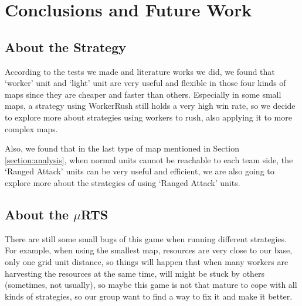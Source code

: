 \section{Conclusions and Future Work}

\subsection*{About the Strategy}

According to the tests we made and literature works we did, we found that ‘worker’ unit
and ‘light’ unit are very useful and flexible in those four kinds of maps since they are
cheaper and faster than others. Especially in some small maps, a strategy using WorkerRush
still holds a very high win rate, so we decide to explore more about strategies using workers
to rush, also applying it to more complex maps.

Also, we found that in the last type of map mentioned in Section \ref{section:analysis},
when normal units cannot be reachable to each team side, the ‘Ranged Attack’ units can
be very useful and efficient, we are also going to explore more about the strategies of
using ‘Ranged Attack’ units.

\subsection*{About the $\mu$RTS}

There are still some small bugs of this game when running different strategies. For example,
when using the smallest map, resources are very close to our base, only one grid unit distance,
so things will happen that when many workers are harvesting the resources at the same time,
will might be stuck by others (sometimes, not usually), so maybe this game is not that mature
to cope with all kinds of strategies, so our group want to find a way to fix it and make it better.